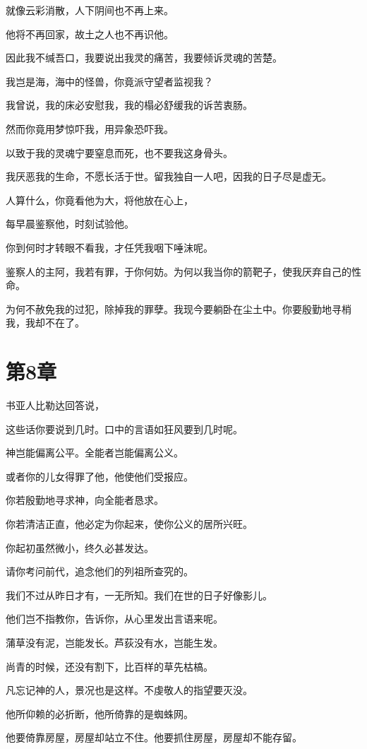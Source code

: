 \documentclass[12pt,oneside]{book}
\begin{document}
就像云彩消散，人下阴间也不再上来。

他将不再回家，故土之人也不再识他。

因此我不缄吾口，我要说出我灵的痛苦，我要倾诉灵魂的苦楚。

我岂是海，海中的怪兽，你竟派守望者监视我？

我曾说，我的床必安慰我，我的榻必舒缓我的诉苦衷肠。

然而你竟用梦惊吓我，用异象恐吓我。

以致于我的灵魂宁要窒息而死，也不要我这身骨头。

我厌恶我的生命，不愿长活于世。留我独自一人吧，因我的日子尽是虚无。

人算什么，你竟看他为大，将他放在心上，

每早晨鉴察他，时刻试验他。

你到何时才转眼不看我，才任凭我咽下唾沫呢。

鉴察人的主阿，我若有罪，于你何妨。为何以我当你的箭靶子，使我厌弃自己的性命。

为何不赦免我的过犯，除掉我的罪孽。我现今要躺卧在尘土中。你要殷勤地寻梢我，我却不在了。


\chapter{第8章}
书亚人比勒达回答说，

这些话你要说到几时。口中的言语如狂风要到几时呢。

神岂能偏离公平。全能者岂能偏离公义。

或者你的儿女得罪了他，他使他们受报应。

你若殷勤地寻求神，向全能者恳求。

你若清洁正直，他必定为你起来，使你公义的居所兴旺。

你起初虽然微小，终久必甚发达。

请你考问前代，追念他们的列祖所查究的。

我们不过从昨日才有，一无所知。我们在世的日子好像影儿。

他们岂不指教你，告诉你，从心里发出言语来呢。

蒲草没有泥，岂能发长。芦荻没有水，岂能生发。

尚青的时候，还没有割下，比百样的草先枯槁。

凡忘记神的人，景况也是这样。不虔敬人的指望要灭没。

他所仰赖的必折断，他所倚靠的是蜘蛛网。

他要倚靠房屋，房屋却站立不住。他要抓住房屋，房屋却不能存留。
\end{document}

